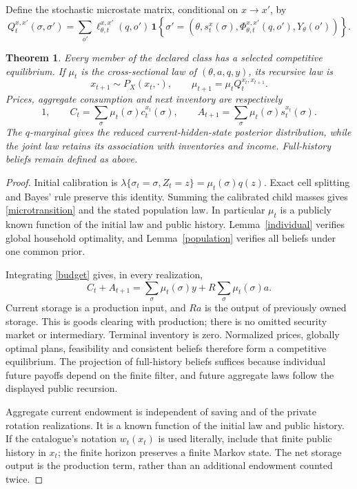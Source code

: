 \documentclass[11pt]{article}
\newtheorem{theorem}{Theorem}
\newcommand{\ind}{\mathbf1}
\begin{document}
Define the stochastic microstate matrix, conditional on $x\to x'$, by
\begin{equation}\label{microtransition}
 Q_t^{x,x'}(\sigma,\sigma')=
 \sum_{o'}\ell^{x,x'}_{\theta,t}(q,o')\,
 \ind\!\left\{\sigma'=
  (\theta,s_t^x(\sigma),\Phi^{x,x'}_{\theta,t}(q,o'),Y_\theta(o'))\right\}.
\end{equation}
\begin{theorem}\label{equilibrium}
Every member of the declared class has a selected competitive equilibrium. If $\mu_t$ is the cross-sectional law of $(\theta,a,q,y)$, its recursive law is
\[
 x_{t+1}\sim P_X(x_t,\cdot),\qquad
 \mu_{t+1}=\mu_tQ_t^{x_t,x_{t+1}}.
\]
Prices, aggregate consumption and next inventory are respectively
\[
 1,\qquad C_t=\sum_\sigma\mu_t(\sigma)c_t^{x_t}(\sigma),\qquad
 A_{t+1}=\sum_\sigma\mu_t(\sigma)s_t^{x_t}(\sigma).
\]
The $q$-marginal gives the reduced current-hidden-state posterior distribution, while the joint law retains its association with inventories and income. Full-history beliefs remain defined as above.
\end{theorem}
\begin{proof}
Initial calibration is
$\lambda\{\sigma_t=\sigma,Z_t=z\}=\mu_t(\sigma)q(z)$.
Exact cell splitting and Bayes' rule preserve this identity. Summing the calibrated child masses gives \eqref{microtransition} and the stated population law. In particular $\mu_t$ is a publicly known function of the initial law and public history. Lemma~\ref{individual} verifies global household optimality, and Lemma~\ref{population} verifies all beliefs under one common prior.

Integrating \eqref{budget} gives, in every realization,
\[
 C_t+A_{t+1}=\sum_\sigma\mu_t(\sigma)y
                       +R\sum_\sigma\mu_t(\sigma)a.
\]
Current storage is a production input, and $Ra$ is the output of previously owned storage. This is goods clearing with production; there is no omitted security market or intermediary. Terminal inventory is zero. Normalized prices, globally optimal plans, feasibility and consistent beliefs therefore form a competitive equilibrium. The projection of full-history beliefs suffices because individual future payoffs depend on the finite filter, and future aggregate laws follow the displayed public recursion.

Aggregate current endowment is independent of saving and of the private rotation realizations. It is a known function of the initial law and public history. If the catalogue's notation $w_t(x_t)$ is used literally, include that finite public history in $x_t$; the finite horizon preserves a finite Markov state. The net storage output is the production term, rather than an additional endowment counted twice.
\end{proof}
\end{document}

